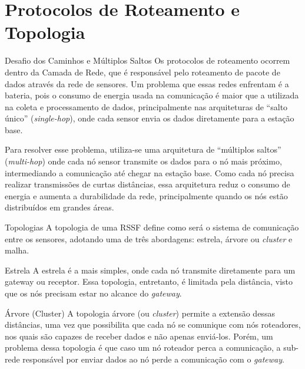

\section{Protocolos de Roteamento e Topologia}

\begin{frame}{Desafio dos Caminhos e Múltiplos Saltos}
    Os protocolos de roteamento ocorrem dentro da Camada de Rede, que é responsável pelo roteamento de pacote de dados através da rede de sensores. Um problema que essas redes enfrentam é a bateria, pois o consumo de energia usada na comunicação é maior que a utilizada na coleta e processamento de dados, principalmente nas arquiteturas de “salto único” (\textit{single-hop}), onde cada sensor envia os dados diretamente para a estação base. 

    
    Para resolver esse problema, utiliza-se uma arquitetura de “múltiplos saltos” (\textit{multi-hop}) onde cada nó sensor transmite os dados para o nó mais próximo, intermediando a comunicação até chegar na estação base. Como cada nó precisa realizar transmissões de curtas distâncias, essa arquitetura reduz o consumo de energia e aumenta a durabilidade da rede, principalmente quando os nós estão distribuídos em grandes áreas.
\end{frame}

\begin{frame}{Topologias}
    A topologia de uma RSSF define como será o sistema de comunicação entre os sensores, adotando uma de três abordagens: estrela, árvore ou \textit{cluster} e malha.
\end{frame}

\begin{frame}{Estrela}
    A estrela é a mais simples, onde cada nó transmite diretamente para um gateway ou receptor. Essa topologia, entretanto, é limitada pela distância, visto que os nós precisam estar no alcance do \textit{gateway}.
\end{frame}

\begin{frame}{Árvore (Cluster)}
    A topologia árvore (ou \textit{cluster}) permite a extensão dessas distâncias, uma vez que possibilita que cada nó se comunique com nós roteadores, nos quais são capazes de receber dados e não apenas enviá-los. Porém, um problema dessa topologia é que caso um nó roteador perca a comunicação, a sub-rede responsável por enviar dados ao nó perde a comunicação com o \textit{gateway}.
\end{frame}

